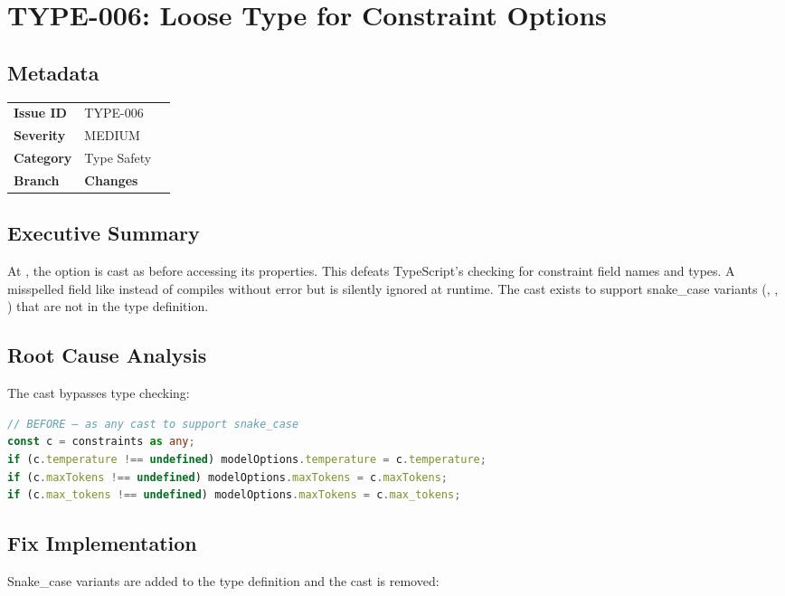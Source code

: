 \section{TYPE-006: Loose Type for Constraint Options}
\label{sec:type-006}
\subsection*{Metadata}
\begin{tabular}{ll}
\textbf{Issue ID} & TYPE-006 \\
\textbf{Severity} & MEDIUM \\
\textbf{Category} & Type Safety \\
\textbf{Branch} & 
\textbf{Changes} &  \\
\end{tabular}

\subsection*{Executive Summary}
At , the  option is cast as  before accessing its properties. This defeats TypeScript's checking for constraint field names and types. A misspelled field like  instead of  compiles without error but is silently ignored at runtime. The  cast exists to support snake\_case variants (, , ) that are not in the type definition.

\subsection*{Root Cause Analysis}
The  cast bypasses type checking:

\begin{lstlisting}[language=TypeScript]
// BEFORE — as any cast to support snake_case
const c = constraints as any;
if (c.temperature !== undefined) modelOptions.temperature = c.temperature;
if (c.maxTokens !== undefined) modelOptions.maxTokens = c.maxTokens;
if (c.max_tokens !== undefined) modelOptions.maxTokens = c.max_tokens;
\end{lstlisting}

\subsection*{Fix Implementation}
Snake\_case variants are added to the type definition and the cast is removed:

